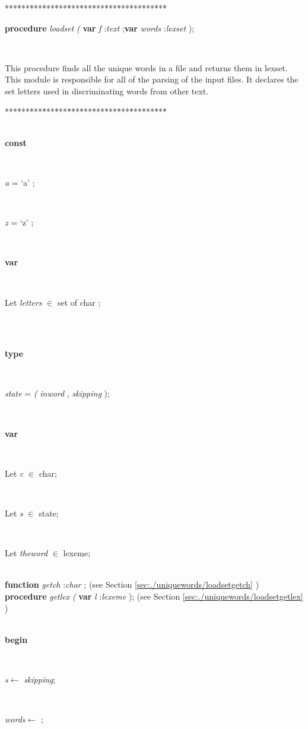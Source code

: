 \documentclass[10pt, a4paper]{article}
\begin{document}
\begin{tabbing}
***\=***\=***\=***\=***\=***\=***\=***\=***\=***\=***\=***\=***\=\kill
\parbox{14cm}{\textsf{\textbf{procedure}  \textit{loadset} \textit{(} \textbf{var}  \textit{f} :\textit{text} ;\textbf{var}  \textit{words} :\textit{lexset} );}}\\
\end{tabbing}
This procedure finds all the unique words in a file
and returns them in lexset.
This module is responsible for all of the parsing of
the input files.
It declares the set \textsf{letters} used in discriminating words
from other text.
\begin{tabbing}
***\=***\=***\=***\=***\=***\=***\=***\=***\=***\=***\=***\=***\=\kill
\\
\\
\+\parbox{14cm}{\textsf{\textbf{const} }}\\
\parbox{14cm}{\textsf{\textit{a} =\textrm{\textup { `a' } };}}\\
\parbox{14cm}{\textsf{\textit{z} =\textrm{\textup { `z' } };}}\\
\<\parbox{14cm}{\textsf{\textbf{var} }}\\
\parbox{14cm}{\textsf{Let \textit{letters} $\in$ set of char ;}}\\
\\
\<\parbox{14cm}{\textsf{\textbf{type} }}\\
\parbox{14cm}{\textsf{\textit{state}  = \textit{(} \textit{inword} , \textit{skipping} );}}\\
\<\parbox{14cm}{\textsf{\textbf{var} }}\\
\parbox{14cm}{\textsf{Let \textit{c} $\in$  char;}}\\
\parbox{14cm}{\textsf{Let \textit{s} $\in$  state;}}\\
\parbox{14cm}{\textsf{Let \textit{theword} $\in$ lexeme;}}\\
\<\textsf{\textbf{function}  \textit{getch} :\textit{char} ;} (see Section \ref{sec:./uniquewords/loadsetgetch} )\\
\<\textsf{\textbf{procedure}  \textit{getlex} \textit{(} \textbf{var}  \textit{l} :\textit{lexeme} );} (see Section \ref{sec:./uniquewords/loadsetgetlex} )\\
\\
\-\<\+\parbox{14cm}{\textsf{\textbf{begin} }}\\
\parbox{14cm}{\textsf{\textit{s}$\leftarrow$ \textit{skipping}}; }\\
\parbox{14cm}{\textsf{\textit{words}$\leftarrow$ \textit{}}; }\\

\end{tabbing}
\end{document}
